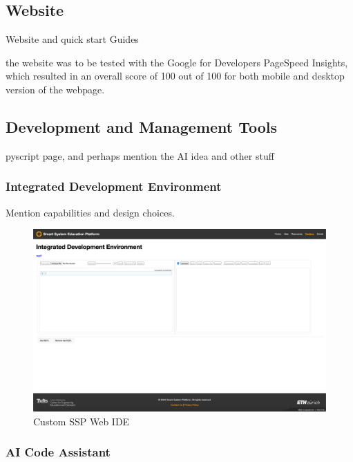 \subsection{\label{sec:res_website}Website}

Website and quick start Guides

the website was to be tested with the Google for Developers PageSpeed Insights, which resulted in an overall score of 100 out of 100 for both mobile and desktop version of the webpage.

\subsection{\label{sec:res_tools}Development and Management Tools}

pyscript page, and perhaps mention the AI idea and other stuff

\subsubsection{\label{sec:res_ide}Integrated Development Environment}

Mention capabilities and design choices. 

\begin{figure}[H]
    \centering
    \includegraphics[width=\linewidth]{overleaf/images/ide_raw.png}
    \vspace{\ftspace}
    \caption{Custom SSP Web IDE}
    \vspace{\ftspace}
    \label{fig:ide_raw}
\end{figure}

\subsubsection{\label{sec:res_ai_code}AI Code Assistant}

